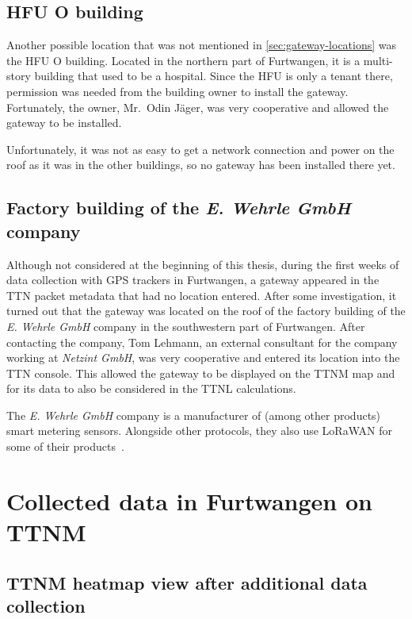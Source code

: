 \subsection{\acs{HFU} O building}\label{subsec:conclusion-hfu-o-building}

Another possible location that was not mentioned in \cref{sec:gateway-locations} was the \ac{HFU} O building.
Located in the northern part of Furtwangen, it is a multi-story building that used to be a hospital.
Since the \ac{HFU} is only a tenant there, permission was needed from the building owner to install the gateway.
Fortunately, the owner, Mr.\ Odin Jäger, was very cooperative and allowed the gateway to be installed.

Unfortunately, it was not as easy to get a network connection and power on the roof as it was in the other buildings, so no gateway has been installed there yet.

\subsection{Factory building of the \emph{E. Wehrle GmbH} company}\label{subsec:factory-building-of-the-e-wehrle-company}

Although not considered at the beginning of this thesis, during the first weeks of data collection with \ac{GPS} trackers in Furtwangen, a gateway appeared in the \ac{TTN} packet metadata that had no location entered.
After some investigation, it turned out that the gateway was located on the roof of the factory building of the \emph{E. Wehrle GmbH} company in the southwestern part of Furtwangen.
After contacting the company, Tom Lehmann, an external consultant for the company working at \emph{Netzint GmbH}, was very cooperative and entered its location into the \ac{TTN} console.
This allowed the gateway to be displayed on the \ac{TTNM} map and for its data to also be considered in the \ac{TTNL} calculations.

The \emph{E. Wehrle GmbH} company is a manufacturer of (among other products) smart metering sensors.
Alongside other protocols, they also use \ac{LoRaWAN} for some of their products~\cite{e_wehrle_gmbh_wecount-s_nodate}.

\section{Collected data in Furtwangen on \acl{TTNM}}\label{sec:collected-data-in-furtwangen-on-ttnm}

\subsection{\acl{TTNM} heatmap view after additional data collection}\label{sec:ttm_heatmap_after}

